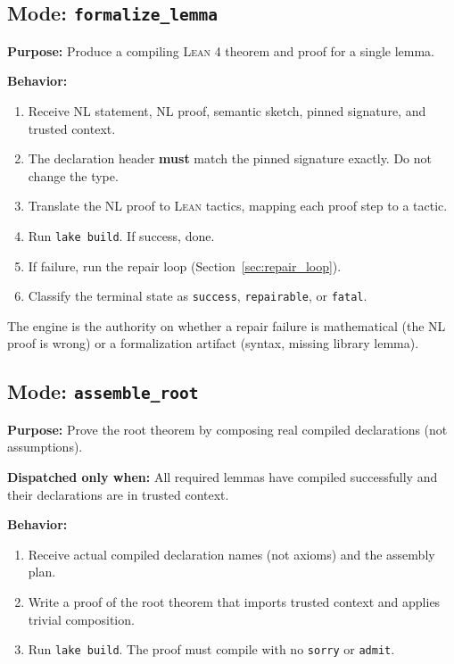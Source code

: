 \documentclass[11pt,a4paper]{article}
\newcommand{\Lean}{\textsc{Lean}}
\begin{document}
\subsection{Mode: \texttt{formalize\_lemma}}

\textbf{Purpose:} Produce a compiling \Lean{} 4 theorem and proof for a single lemma.

\textbf{Behavior:}
\begin{enumerate}[leftmargin=2em]
  \item Receive NL statement, NL proof, semantic sketch, pinned signature, and trusted context.
  \item The declaration header \textbf{must} match the pinned signature exactly. Do not change the type.
  \item Translate the NL proof to \Lean{} tactics, mapping each proof step to a tactic.
  \item Run \texttt{lake build}. If success, done.
  \item If failure, run the repair loop (Section~\ref{sec:repair_loop}).
  \item Classify the terminal state as \texttt{success}, \texttt{repairable}, or \texttt{fatal}.
\end{enumerate}

The engine is the authority on whether a repair failure is mathematical (the NL proof is wrong) or a formalization artifact (syntax, missing library lemma).

\subsection{Mode: \texttt{assemble\_root}}

\textbf{Purpose:} Prove the root theorem by composing real compiled declarations (not assumptions).

\textbf{Dispatched only when:} All required lemmas have compiled successfully and their declarations are in trusted context.

\textbf{Behavior:}
\begin{enumerate}[leftmargin=2em]
  \item Receive actual compiled declaration names (not axioms) and the assembly plan.
  \item Write a proof of the root theorem that imports trusted context and applies trivial composition.
  \item Run \texttt{lake build}. The proof must compile with no \texttt{sorry} or \texttt{admit}.
\end{enumerate}
\end{document}
